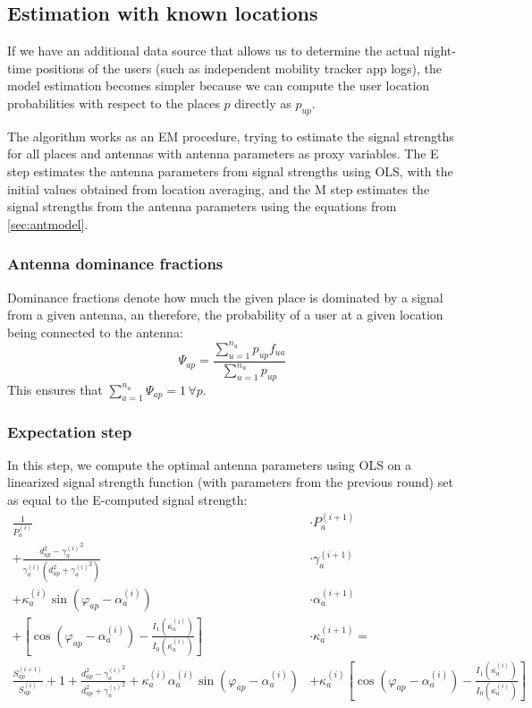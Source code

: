 \documentclass[a4paper]{article}
\begin{document}
\subsection{Estimation with known locations} \label{sec:locest}
If we have an additional data source that allows us to determine the actual
night-time positions of the users (such as independent mobility tracker app
logs), the model estimation becomes simpler because we can compute the user
location probabilities with respect to the places $p$ directly as $p_{up}$.

The algorithm works as an EM procedure, trying to estimate the signal strengths
for all places and antennas with antenna parameters as proxy variables.
The E step estimates the antenna parameters from signal strengths using OLS,
with the initial values obtained from location averaging, and the M step
estimates the signal strengths from the antenna parameters using the equations
from \ref{sec:antmodel}.

\subsubsection{Antenna dominance fractions}
Dominance fractions denote how much the given place is dominated by a signal
from a given antenna, an therefore, the probability of a user at a given
location being connected to the antenna:
\begin{equation}
\Psi_{ap} = \frac
    {\sum_{u=1}^{n_u} p_{up} f_{ua}}
    {\sum_{u=1}^{n_u} p_{up}}
\end{equation}
This ensures that $\sum_{a=1}^{n_a} \Psi_{ap} = 1 \,\forall p$.

\subsubsection{Expectation step}
In this step, we compute the optimal antenna parameters using OLS on a
linearized signal strength function (with parameters from the previous round)
set as equal to the E-computed signal strength:
\begin{align}
\frac{1}{P_a^{(i)}} &\cdot P_a^{(i+1)} \nonumber \\
+ \frac
    {d_{ap}^2 - {\gamma_a^{(i)}}^2}
    {\gamma_a^{(i)} (d_{ap}^2 + {\gamma_a^{(i)}}^2)}
    &\cdot \gamma_a^{(i+1)} \nonumber \\
+ \kappa_a^{(i)} \sin{(\varphi_{ap} - \alpha_a^{(i)})}
    &\cdot \alpha_a^{(i+1)} \nonumber \\
+ \left[
        \cos{(\varphi_{ap} - \alpha_a^{(i)})}
        - \frac{I_1(\kappa_a^{(i)})}{I_0(\kappa_a^{(i)})}
    \right] &\cdot \kappa_a^{(i+1)} =\\
\frac{S_{ap}^{(i+1)}}{S_{ap}^{(i)}}
+ 1
+ \frac
    {d_{ap}^2 - {\gamma_a^{(i)}}^2}
    {d_{ap}^2 + {\gamma_a^{(i)}}^2}
+ \kappa_a^{(i)} \alpha_a^{(i)} \sin{(\varphi_{ap} - \alpha_a^{(i)})}
&+ \kappa_a^{(i)} \left[
        \cos{(\varphi_{ap} - \alpha_a^{(i)})}
        - \frac{I_1(\kappa_a^{(i)})}{I_0(\kappa_a^{(i)})}
    \right] \nonumber
\end{align}
\end{document}
